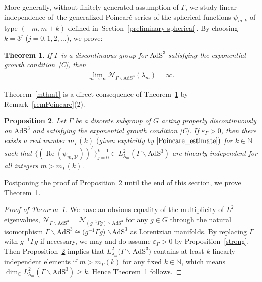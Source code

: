 \documentclass[pdftex]{sigma}
\numberwithin{equation}{section}
\newtheorem{Theorem}{Theorem}[section]
\newtheorem{Proposition}[Theorem]{Proposition}
\begin{document}
More generally, without finitely generated assumption of $\Gamma$,
we study linear independence of~the generalized Poincar\'e series
of the spherical functions $\psi_{m,k}$ of type $(-m,m+k)$
defined in~Section~\ref{preliminary-spherical}.
By choosing $k=3^{j}$ ($j=0,1,2,\ldots$),
we prove:
\begin{Theorem}
\label{unbound}
If $\Gamma$ is a discontinuous group for $\mathrm{AdS}^{3}$ satisfying
the exponential growth condition~\eqref{C}, then
\begin{gather*}
\lim_{m\to\infty}\mathcal{N}_{\Gamma\backslash\mathrm{AdS}^{3}}(\lambda_{m})=\infty.
\end{gather*}
\end{Theorem}
Theorem~\ref{mthm1} is a direct consequence of
Theorem~\ref{unbound} by Remark~\ref{remPoincare}(2).

\begin{Proposition}
\label{mainthm}
Let $\Gamma$ be a discrete subgroup of $G$ acting properly discontinuously
on $\mathrm{AdS}^{3}$
and satisfying the exponential growth condition \eqref{C}.
If $\varepsilon_{\Gamma}>0$,
then there exists a real number $m_{\Gamma}(k)$
$($given explicitly by $\eqref{Poincare_estimate})$
for $k\in \mathbb{N}$
such that
$\{(\operatorname{Re}(\psi_{m,3^{j}}))^{\Gamma}\}_{j=0}^{k-1}
\subset L^2_{\lambda_{m}}(\Gamma\backslash\mathrm{AdS}^{3})$
are linearly independent
for all integers $m > m_{\Gamma}(k)$.
\end{Proposition}

Postponing the proof of Proposition~\ref{mainthm} until the end of this section,
we prove Theorem~\ref{unbound}.

\begin{proof}[Proof of Theorem~\ref{unbound}]
We have an obvious equality of the multiplicity of $L^2$-eigenvalues,
$\mathcal{N}_{\Gamma\backslash\mathrm{AdS}^{3}} =
\mathcal{N}_{(g^{-1}\Gamma g)\backslash\mathrm{AdS}^{3}}$
for any $g\in G$
through the natural isomorphism
$\Gamma\backslash\mathrm{AdS}^{3} \cong
\big(g^{-1}\Gamma g\big)$ $\backslash\mathrm{AdS}^{3}$ as Lorentzian manifolds.
By replacing $\Gamma$ with $g^{-1}\Gamma g$ if necessary,
we may and do assume $\varepsilon_{\Gamma}>0$ by Proposition~\ref{strong}.
Then Proposition~\ref{mainthm} implies that
$L^2_{\lambda_{m}}\big(\Gamma\backslash \mathrm{AdS}^{3}\big)$ contains at least
$k$ linearly independent elements
if $m>m_{\Gamma}(k)$ for any fixed $k\in\mathbb{N}$,
which means
$\dim_{\mathbb{C}} L^2_{\lambda_{m}}(\Gamma\backslash\mathrm{AdS}^{3})
\geq k.$
Hence Theorem~\ref{unbound} follows.
\end{proof}
\end{document}
